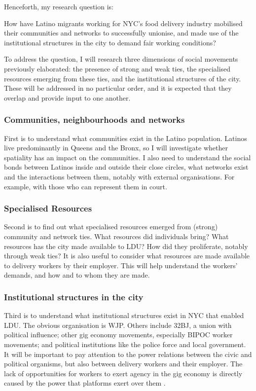 \documentclass{article}[12pt]
\begin{document}
Henceforth, my research question is:

\begin{center}
How have Latino migrants working for NYC's food delivery industry mobilised their communities and networks to successfully unionise, and made use of the institutional structures in the city to demand fair working conditions?
\end{center}

To address the question, I will research three dimensions of social movements previously elaborated: the presence of strong and weak ties, the specialised resources emerging from these ties, and the institutional structures of the city. 
These will be addressed in no particular order, and it is expected that they overlap and provide input to one another.

\subsubsection{Communities, neighbourhoods and networks}

First is to understand what communities exist in the Latino population. Latinos live predominantly in Queens and the Bronx, so I will investigate whether spatiality has an impact on the communities. I also need to understand the social bonds between Latinos inside and outside their close circles, what networks exist and the interactions between them, notably with external organisations. For example, with those who can represent them in court.

\subsubsection{Specialised Resources}

Second is to find out what specialised resources emerged from (strong) community and network ties. What resources did individuals bring? What resources has the city made available to LDU? How did they proliferate, notably through weak ties?
It is also useful to consider what resources are made available to delivery workers by their employer. This will help understand the workers' demands, and how and to whom they are made.

\subsubsection{Institutional structures in the city}

Third is to understand what institutional structures exist in NYC that enabled LDU. The obvious organisation is WJP. Others include 32BJ, a union with political influence; other gig economy movements, especially BIPOC worker movements; and political institutions like the police force and local government. It will be important to pay attention to the power relations between the civic and political organisms, but also between delivery workers and their employer.
The lack of opportunities for workers to exert agency in the gig economy is directly caused by the power that platforms exert over them \parencite{anwar2020hidden}.
\end{document}
